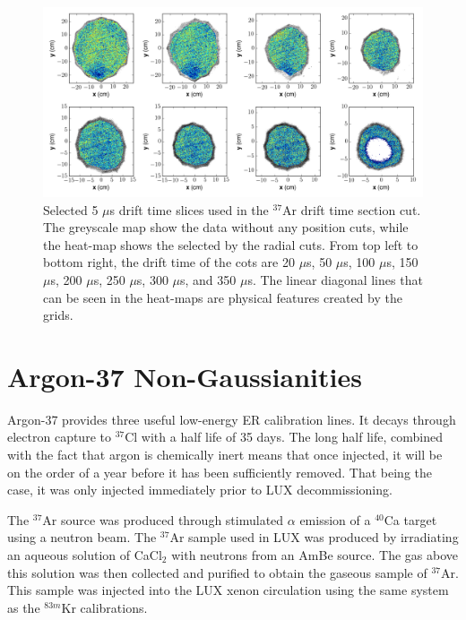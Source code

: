 \begin{figure}[h!]
\centering
  \includegraphics[width=\textwidth]{Figures/xycut_xy.png}
\caption{Selected 5 $\mu$s drift time slices used in the $^{37}$Ar drift time section cut. The greyscale map show the data without any position cuts, while the heat-map shows the selected by the radial cuts. From top left to bottom right, the drift time of the cots are 20 $\mu$s, 50 $\mu$s, 100 $\mu$s, 150 $\mu$s, 200 $\mu$s, 250 $\mu$s, 300 $\mu$s, and 350 $\mu$s. The linear diagonal lines that can be seen in the heat-maps are physical features created by the grids.}
\label{fig:xycut_xy}
\end{figure}



\section{Argon-37 Non-Gaussianities}
Argon-37 provides three useful low-energy ER calibration lines. It decays through electron capture to $^{37}$Cl with a half life of 35 days. The long half life, combined with the fact that argon is chemically inert means that once injected, it will be on the order of a year before it has been sufficiently removed. That being the case, it was only injected immediately prior to LUX decommissioning.\cite{ar371,pixey_ar37}

The $^{37}$Ar source was produced through stimulated $\alpha$ emission of a $^{40}$Ca target using a neutron beam. The $^{37}$Ar sample used in LUX was produced by irradiating an aqueous solution of CaCl$_2$ with neutrons from an AmBe source. The gas above this solution was then collected and purified to obtain the gaseous sample of $^{37}$Ar\cite{pixey_ar37}. This sample was injected into the LUX xenon circulation using the same system as the $^{83m}$Kr calibrations\cite{lux_kr2}.

